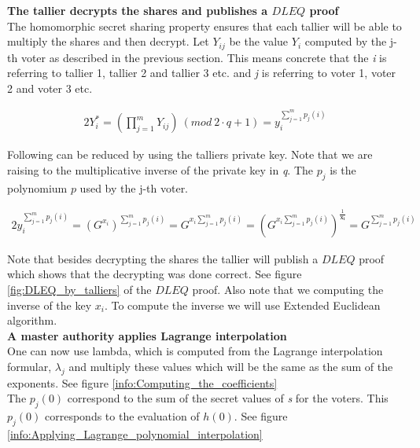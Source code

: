 \noindent
\textbf{The tallier decrypts the shares and publishes a $DLEQ$ proof}\\
The homomorphic secret sharing property ensures that each tallier will  be able to multiply the shares and then decrypt. Let $Y_{ij}$ be the value $Y_i$ computed by the j-th voter as described in the previous section. This means concrete that the \textit{i} is referring to tallier 1, tallier  2 and tallier 3 etc. and \textit{j} is referring to voter 1, voter 2 and voter 3 etc.

\begin{alignat*}{2}
Y_i^*=(\prod\limits_{j=1}^{m} Y_{ij}) \ (mod\ 2 \cdot q+1) =y_i^{\sum\limits_{j=1}^m p_j(i)}
\end{alignat*}


\noindent
Following can be reduced by using the talliers private key. Note that we are raising to the multiplicative inverse of the private key in  \textit{q}. The $p_j$ is the polynomium $p$ used by the j-th voter.


\begin{alignat*}{2}
y_i^{\sum\limits_{j=1}^m p_j(i)}=(G^{x_i})^{\sum\limits_{j=1}^m p_j(i)} = G^{x_i \sum\limits_{j=1}^m p_j(i)}= (G^{x_i \sum\limits_{j=1}^m p_j(i)})^{\frac{1}{\mathbf{x_i}}}= G^{ \sum\limits_{j=1}^m p_j(i)}
\end{alignat*}


\noindent
Note that besides decrypting the shares the tallier will publish a $DLEQ$ proof which shows that the decrypting was done correct. See figure \ref{fig:DLEQ_by_talliers} of the $DLEQ$ proof. Also note that we computing the inverse of the key $x_i$. To compute the inverse we will use Extended Euclidean algorithm.\\


\noindent
\textbf{A master authority applies Lagrange interpolation}\\
One can now use lambda, which is computed from the  Lagrange interpolation formular, \begin{math} \lambda_j \end{math} and multiply these values which will be the same as the sum of the exponents. See figure \ref{info:Computing_the_coefficients} \\

\noindent
The \begin{math}p_j(0) \end{math} correspond to the sum of the secret values of \textit{s} for the voters. This \begin{math}p_j(0)\end{math} corresponds to the evaluation of \begin{math}h(0)\end{math}. See figure  \ref{info:Applying_Lagrange_polynomial_interpolation}


